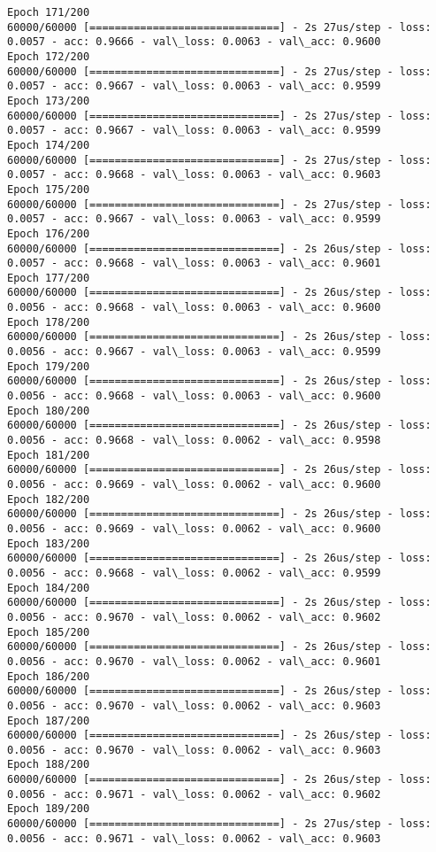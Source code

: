 \documentclass[11pt]{article}
\begin{document}
\begin{Verbatim}[commandchars=\\\{\}]
Epoch 171/200
60000/60000 [==============================] - 2s 27us/step - loss: 0.0057 - acc: 0.9666 - val\_loss: 0.0063 - val\_acc: 0.9600
Epoch 172/200
60000/60000 [==============================] - 2s 27us/step - loss: 0.0057 - acc: 0.9667 - val\_loss: 0.0063 - val\_acc: 0.9599
Epoch 173/200
60000/60000 [==============================] - 2s 27us/step - loss: 0.0057 - acc: 0.9667 - val\_loss: 0.0063 - val\_acc: 0.9599
Epoch 174/200
60000/60000 [==============================] - 2s 27us/step - loss: 0.0057 - acc: 0.9668 - val\_loss: 0.0063 - val\_acc: 0.9603
Epoch 175/200
60000/60000 [==============================] - 2s 27us/step - loss: 0.0057 - acc: 0.9667 - val\_loss: 0.0063 - val\_acc: 0.9599
Epoch 176/200
60000/60000 [==============================] - 2s 26us/step - loss: 0.0057 - acc: 0.9668 - val\_loss: 0.0063 - val\_acc: 0.9601
Epoch 177/200
60000/60000 [==============================] - 2s 26us/step - loss: 0.0056 - acc: 0.9668 - val\_loss: 0.0063 - val\_acc: 0.9600
Epoch 178/200
60000/60000 [==============================] - 2s 26us/step - loss: 0.0056 - acc: 0.9667 - val\_loss: 0.0063 - val\_acc: 0.9599
Epoch 179/200
60000/60000 [==============================] - 2s 26us/step - loss: 0.0056 - acc: 0.9668 - val\_loss: 0.0063 - val\_acc: 0.9600
Epoch 180/200
60000/60000 [==============================] - 2s 26us/step - loss: 0.0056 - acc: 0.9668 - val\_loss: 0.0062 - val\_acc: 0.9598
Epoch 181/200
60000/60000 [==============================] - 2s 26us/step - loss: 0.0056 - acc: 0.9669 - val\_loss: 0.0062 - val\_acc: 0.9600
Epoch 182/200
60000/60000 [==============================] - 2s 26us/step - loss: 0.0056 - acc: 0.9669 - val\_loss: 0.0062 - val\_acc: 0.9600
Epoch 183/200
60000/60000 [==============================] - 2s 26us/step - loss: 0.0056 - acc: 0.9668 - val\_loss: 0.0062 - val\_acc: 0.9599
Epoch 184/200
60000/60000 [==============================] - 2s 26us/step - loss: 0.0056 - acc: 0.9670 - val\_loss: 0.0062 - val\_acc: 0.9602
Epoch 185/200
60000/60000 [==============================] - 2s 26us/step - loss: 0.0056 - acc: 0.9670 - val\_loss: 0.0062 - val\_acc: 0.9601
Epoch 186/200
60000/60000 [==============================] - 2s 26us/step - loss: 0.0056 - acc: 0.9670 - val\_loss: 0.0062 - val\_acc: 0.9603
Epoch 187/200
60000/60000 [==============================] - 2s 26us/step - loss: 0.0056 - acc: 0.9670 - val\_loss: 0.0062 - val\_acc: 0.9603
Epoch 188/200
60000/60000 [==============================] - 2s 26us/step - loss: 0.0056 - acc: 0.9671 - val\_loss: 0.0062 - val\_acc: 0.9602
Epoch 189/200
60000/60000 [==============================] - 2s 27us/step - loss: 0.0056 - acc: 0.9671 - val\_loss: 0.0062 - val\_acc: 0.9603

\end{Verbatim}
\end{document}
